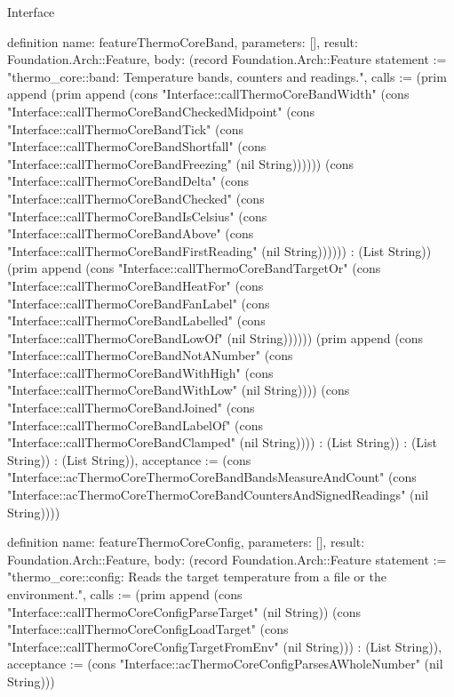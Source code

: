 \begin{lexlean}{Interface}
\begin{semanticmodule}
definition{
  name: featureThermoCoreBand,
  parameters: [],
  result: Foundation.Arch::Feature,
  body: (record Foundation.Arch::Feature {statement := "thermo_core::band: Temperature bands, counters and readings.", calls := (prim append (prim append (cons "Interface::callThermoCoreBandWidth" (cons "Interface::callThermoCoreBandCheckedMidpoint" (cons "Interface::callThermoCoreBandTick" (cons "Interface::callThermoCoreBandShortfall" (cons "Interface::callThermoCoreBandFreezing" (nil String)))))) (cons "Interface::callThermoCoreBandDelta" (cons "Interface::callThermoCoreBandChecked" (cons "Interface::callThermoCoreBandIsCelsius" (cons "Interface::callThermoCoreBandAbove" (cons "Interface::callThermoCoreBandFirstReading" (nil String)))))) : (List String)) (prim append (cons "Interface::callThermoCoreBandTargetOr" (cons "Interface::callThermoCoreBandHeatFor" (cons "Interface::callThermoCoreBandFanLabel" (cons "Interface::callThermoCoreBandLabelled" (cons "Interface::callThermoCoreBandLowOf" (nil String)))))) (prim append (cons "Interface::callThermoCoreBandNotANumber" (cons "Interface::callThermoCoreBandWithHigh" (cons "Interface::callThermoCoreBandWithLow" (nil String)))) (cons "Interface::callThermoCoreBandJoined" (cons "Interface::callThermoCoreBandLabelOf" (cons "Interface::callThermoCoreBandClamped" (nil String)))) : (List String)) : (List String)) : (List String)), acceptance := (cons "Interface::acThermoCoreThermoCoreBandBandsMeasureAndCount" (cons "Interface::acThermoCoreThermoCoreBandCountersAndSignedReadings" (nil String)))})
}

definition{
  name: featureThermoCoreConfig,
  parameters: [],
  result: Foundation.Arch::Feature,
  body: (record Foundation.Arch::Feature {statement := "thermo_core::config: Reads the target temperature from a file or the environment.", calls := (prim append (cons "Interface::callThermoCoreConfigParseTarget" (nil String)) (cons "Interface::callThermoCoreConfigLoadTarget" (cons "Interface::callThermoCoreConfigTargetFromEnv" (nil String))) : (List String)), acceptance := (cons "Interface::acThermoCoreConfigParsesAWholeNumber" (nil String))})
}


\end{semanticmodule}
\end{lexlean}
